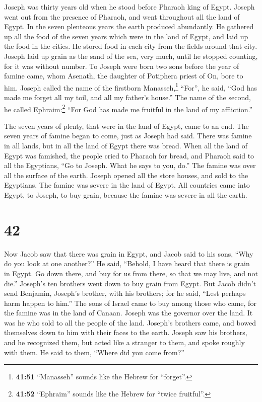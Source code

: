  Joseph was thirty years old when he stood before Pharaoh
king of Egypt. Joseph went out from the presence of Pharaoh, and went
throughout all the land of Egypt.  In the seven plenteous
years the earth produced abundantly.  He gathered up all
the food of the seven years which were in the land of Egypt, and laid up
the food in the cities. He stored food in each city from the fields
around that city.  Joseph laid up grain as the sand of
the sea, very much, until he stopped counting, for it was without
number.  To Joseph were born two sons before the year of
famine came, whom Asenath, the daughter of Potiphera priest of On, bore
to him.  Joseph called the name of the firstborn
Manasseh,\footnote{\textbf{41:51} ``Manasseh'' sounds like the Hebrew
  for ``forget''.} ``For'', he said, ``God has made me forget all my
toil, and all my father's house.''  The name of the
second, he called Ephraim:\footnote{\textbf{41:52} ``Ephraim'' sounds
  like the Hebrew for ``twice fruitful''.} ``For God has made me
fruitful in the land of my affliction.''

 The seven years of plenty, that were in the land of
Egypt, came to an end.  The seven years of famine began
to come, just as Joseph had said. There was famine in all lands, but in
all the land of Egypt there was bread.  When all the land
of Egypt was famished, the people cried to Pharaoh for bread, and
Pharaoh said to all the Egyptians, ``Go to Joseph. What he says to you,
do.''  The famine was over all the surface of the earth.
Joseph opened all the store houses, and sold to the Egyptians. The
famine was severe in the land of Egypt.  All countries
came into Egypt, to Joseph, to buy grain, because the famine was severe
in all the earth.

\hypertarget{section-41}{%
\section{42}\label{section-41}}

 Now Jacob saw that there was grain in Egypt, and Jacob
said to his sons, ``Why do you look at one another?''  He
said, ``Behold, I have heard that there is grain in Egypt. Go down
there, and buy for us from there, so that we may live, and not die.''
 Joseph's ten brothers went down to buy grain from Egypt.
 But Jacob didn't send Benjamin, Joseph's brother, with
his brothers; for he said, ``Lest perhaps harm happen to him.''
 The sons of Israel came to buy among those who came, for
the famine was in the land of Canaan.  Joseph was the
governor over the land. It was he who sold to all the people of the
land. Joseph's brothers came, and bowed themselves down to him with
their faces to the earth.  Joseph saw his brothers, and he
recognized them, but acted like a stranger to them, and spoke roughly
with them. He said to them, ``Where did you come from?''

